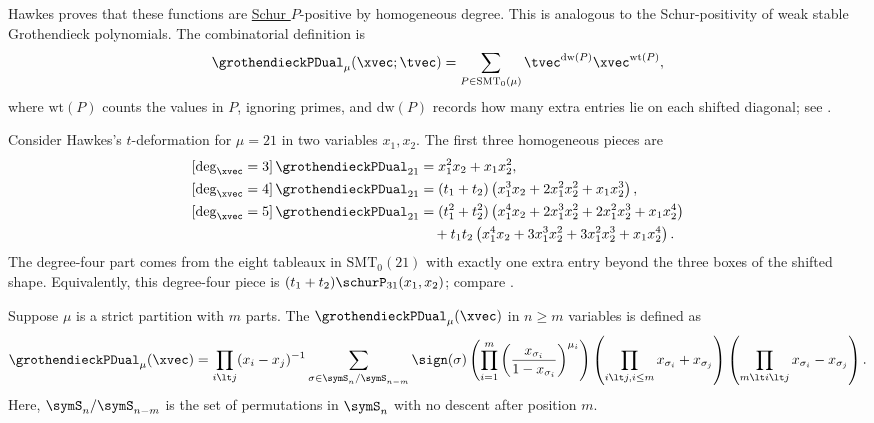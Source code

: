 Hawkes proves that these functions are \hyperref[schurP]{Schur $P$}-positive
by homogeneous degree.  This is analogous to the Schur-positivity of weak
stable Grothendieck polynomials.
The combinatorial definition is
\[
  \grothendieckPDual_\mu(\xvec;\tvec)
  =
  \sum_{P\in \mathrm{SMT}_0(\mu)}
  \tvec^{\mathrm{dw}(P)}\xvec^{\mathrm{wt}(P)},
\]
where $\mathrm{wt}(P)$ counts the values in $P$, ignoring primes, and
$\mathrm{dw}(P)$ records how many extra entries lie on each shifted diagonal;
see \cite[Thm.~4.17]{Hawkes2023}.

\begin{example*}[Shifted multiset tableaux for $\mu=21$]
Consider Hawkes's $t$-deformation for $\mu=21$ in two variables
$x_1,x_2$.  The first three homogeneous pieces are
\begin{align*}
\left[\deg_{\xvec}=3\right]\grothendieckPDual_{21}
&= x_1^2x_2+x_1x_2^2, \\
\left[\deg_{\xvec}=4\right]\grothendieckPDual_{21}
&= (t_1+t_2)
\left(x_1^3x_2+2x_1^2x_2^2+x_1x_2^3\right), \\
\left[\deg_{\xvec}=5\right]\grothendieckPDual_{21}
&= (t_1^2+t_2^2)
\left(x_1^4x_2+2x_1^3x_2^2+2x_1^2x_2^3+x_1x_2^4\right) \\
&\quad
+ t_1t_2
\left(x_1^4x_2+3x_1^3x_2^2+3x_1^2x_2^3+x_1x_2^4\right).
\end{align*}
The degree-four part comes from the eight tableaux in $\mathrm{SMT}_0(21)$
with exactly one extra entry beyond the three boxes of the shifted shape.
Equivalently, this degree-four piece is
$(t_1+t_2)\schurP_{31}(x_1,x_2)$; compare \cite[Ex.~4.18]{Hawkes2023}.
\end{example*}

Suppose $\mu$ is a strict partition with $m$ parts.
The  $\grothendieckPDual_\mu(\xvec)$
in $n \geq m$ variables is defined as
\[
\grothendieckPDual_\mu(\xvec) =
\prod_{i\lt j} (x_i-x_j)^{-1}
\sum_{\sigma \in \symS_n / \symS_{n-m}}
\sign(\sigma)
\left(
\prod_{i=1}^m
\left(
\frac{x_{\sigma_i}}{1-x_{\sigma_i}}
\right)^{\mu_i}
\right)
\left(
\prod_{i \lt j, i \leq m}
x_{\sigma_i} + x_{\sigma_j}
\right)
\left(
\prod_{m \lt i \lt j}
x_{\sigma_i} - x_{\sigma_j}
\right).
\]
Here, $\symS_n / \symS_{n-m}$ is the set of permutations in $\symS_n$
with no descent after position $m$.
